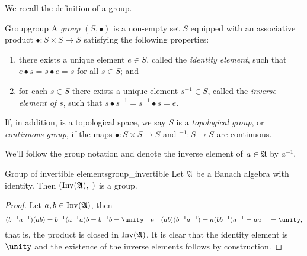 We recall the definition of a group.
\begin{definition}{Group}{group}
    A \emph{group} \((S, \bullet)\) is a non-empty set \(S\) equipped with an associative product \(\bullet : S \times S \to S\) satisfying the following properties:
    \begin{enumerate}[label=(\alph*)]
        \item there exists a unique element \(e \in S\), called the \emph{identity element}, such that \(e\bullet s = s \bullet e = s\) for all \(s \in S\); and
        \item for each \(s \in S\) there exists a unique element \(s^{-1} \in S\), called the \emph{inverse element of \(s\)}, such that \(s \bullet s^{-1} = s^{-1} \bullet s = e\).
    \end{enumerate}
    If, in addition,  is a topological space, we say \(S\) is a \emph{topological group}, or \emph{continuous group}, if the maps \(\bullet : S \times S \to S\) and \(^{-1} : S \to S\) are continuous.
\end{definition}

We'll follow the group notation and denote the inverse element of \(a \in \mathfrak{A}\) by \(a^{-1}\).
\begin{proposition}{Group of invertible elements}{group_invertible}
    Let \(\mathfrak{A}\) be a Banach algebra with identity. Then \((\operatorname{Inv}(\mathfrak{A}), \cdot)\) is a group.
\end{proposition}
\begin{proof}
    Let \(a, b \in \operatorname{Inv}(\mathfrak{A})\), then
    \begin{equation*}
        (b^{-1} a^{-1}) (ab) = b^{-1} (a^{-1}a)b = b^{-1}b = \unity\quad\text{e}\quad
        (ab) (b^{-1} a^{-1}) = a(bb^{-1})a^{-1} = aa^{-1} = \unity,
    \end{equation*}
    that is, the product is closed in \(\operatorname{Inv}(\mathfrak{A})\). It is clear that the identity element is \(\unity\) and the existence of the inverse elements follows by construction.
\end{proof}

